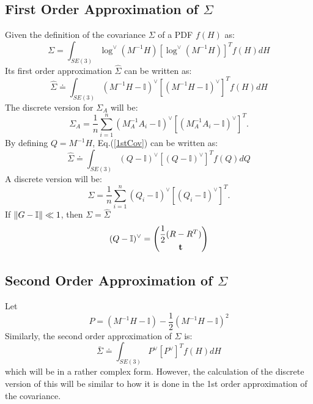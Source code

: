 \documentclass[twocolumn,10pt]{asme2ej}
\DeclarePairedDelimiter{\norm}{\lVert}{\rVert}
\newcommand{\II}{\mathbb{I}}
\newcommand{\ttt}{{\bf t}}
\begin{document}
\subsection{First Order Approximation of $\Sigma$}
Given the definition of the covariance $\Sigma$ of a PDF $f(H)$ as:
\begin{equation} 
\Sigma = \int_{SE(3)} \log^{\vee}(M^{-1} H) [\log^{\vee}(M^{-1} H)]^T  f(H) dH \label{meancovdef} \end{equation}
Its first order approximation $\widehat{\Sigma}$ can be written as:
\begin{equation}
\widehat{\Sigma} \doteq \int_{SE(3)} (M^{-1} H - \II)^{\vee} [(M^{-1} H - \II)^{\vee}]^T  f(H) dH
\label{1stCov}
\end{equation}
The discrete version for $\Sigma_{A}$ will be:
\begin{equation}
\Sigma_A = \frac{1}{n} \sum_{i=1}^{n} (M_A^{-1} A_i- \II)^{\vee} [(M_A^{-1} A_i- \II)^{\vee}]^T.  
\end{equation}
By defining $Q = M^{-1}H$, Eq.(\ref{1stCov}) can be written as:
\begin{equation}
\widehat{\Sigma} \doteq \int_{SE(3)} (Q - \II)^{\vee} [(Q - \II)^{\vee}]^T  f(Q) dQ
\end{equation}
A discrete version will be:
\begin{equation}
\Sigma = \frac{1}{n} \sum_{i=1}^{n} (Q_i - \mathbb{I})^{\vee} [(Q_i - \mathbb{I})^{\vee}]^T. 
\end{equation}
If $\norm{G - \II} \ll 1$, then $\Sigma = \widehat{\Sigma}$
\begin{equation}
(Q - \II)^{\vee} =
\left( 
\begin{matrix}
\dfrac{1}{2}(R -R^{T}) \\
\ttt
\end{matrix}
\right)
\end{equation}



\subsection{Second Order Approximation of $\Sigma$}
Let
\begin{equation}
P = (M^{-1} H - \II) - \dfrac{1}{2}(M^{-1}H - \II)^2
\end{equation}
Similarly, the second order approximation of $\Sigma$ is:
\begin{equation}
\bar{\Sigma} \doteq \int_{SE(3)} P^{\vee} [P^{\vee}]^T  f(H) dH
\label{2ndCov}
\end{equation}
which will be in a rather complex form. However, the calculation of the discrete version of this will be similar to how it is done in the 1st order approximation of the covariance.
\end{document}
